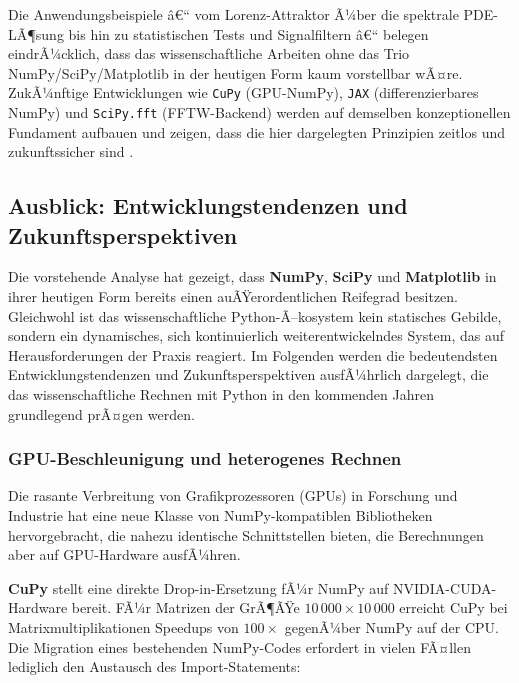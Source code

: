 \documentclass[12pt, a4paper]{article}
\begin{document}
Die Anwendungsbeispiele â€“ vom Lorenz-Attraktor Ã¼ber die spektrale PDE-LÃ¶sung
bis hin zu statistischen Tests und Signalfiltern â€“ belegen eindrÃ¼cklich, dass
das wissenschaftliche Arbeiten ohne das Trio NumPy/SciPy/Matplotlib in der
heutigen Form kaum vorstellbar wÃ¤re. ZukÃ¼nftige Entwicklungen wie
\texttt{CuPy} (GPU-NumPy), \texttt{JAX} (differenzierbares NumPy) und
\texttt{SciPy.fft} (FFTW-Backend) werden auf demselben konzeptionellen
Fundament aufbauen und zeigen, dass die hier dargelegten Prinzipien
zeitlos und zukunftssicher sind \cite{bradbury2018jax}.

\subsection{Ausblick: Entwicklungstendenzen und Zukunftsperspektiven}
\label{subsec:ausblick}

Die vorstehende Analyse hat gezeigt, dass \textbf{NumPy}, \textbf{SciPy}
und \textbf{Matplotlib} in ihrer heutigen Form bereits einen auÃŸerordentlichen
Reifegrad besitzen. Gleichwohl ist das wissenschaftliche Python-Ã–kosystem
kein statisches Gebilde, sondern ein dynamisches, sich kontinuierlich
weiterentwickelndes System, das auf Herausforderungen der Praxis reagiert.
Im Folgenden werden die bedeutendsten Entwicklungstendenzen und
Zukunftsperspektiven ausfÃ¼hrlich dargelegt, die das wissenschaftliche
Rechnen mit Python in den kommenden Jahren grundlegend prÃ¤gen werden.

\subsubsection{GPU-Beschleunigung und heterogenes Rechnen}
\label{subsubsec:gpu}

Die rasante Verbreitung von Grafikprozessoren (GPUs) in Forschung und
Industrie hat eine neue Klasse von NumPy-kompatiblen Bibliotheken
hervorgebracht, die nahezu identische Schnittstellen bieten, die
Berechnungen aber auf GPU-Hardware ausfÃ¼hren.

\textbf{CuPy} \cite{cupy2017} stellt eine direkte Drop-in-Ersetzung fÃ¼r
NumPy auf NVIDIA-CUDA-Hardware bereit. FÃ¼r Matrizen der GrÃ¶ÃŸe
$10\,000 \times 10\,000$ erreicht CuPy bei Matrixmultiplikationen
Speedups von $100\times$ gegenÃ¼ber NumPy auf der CPU. Die Migration
eines bestehenden NumPy-Codes erfordert in vielen FÃ¤llen lediglich den
Austausch des Import-Statements:
\end{document}
